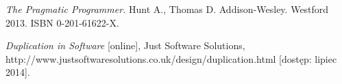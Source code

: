 \begin{thebibliography}{}

  \emph{The Pragmatic Programmer.}
  Hunt A., Thomas D.
  Addison-Wesley.
  Westford 2013.
  ISBN 0-201-61622-X.
 
  \emph{Duplication in Software} [online],
  Just Software Solutions,
  http://www.justsoftwaresolutions.co.uk/design/duplication.html [dostęp: lipiec 2014].
                
\end{thebibliography}
